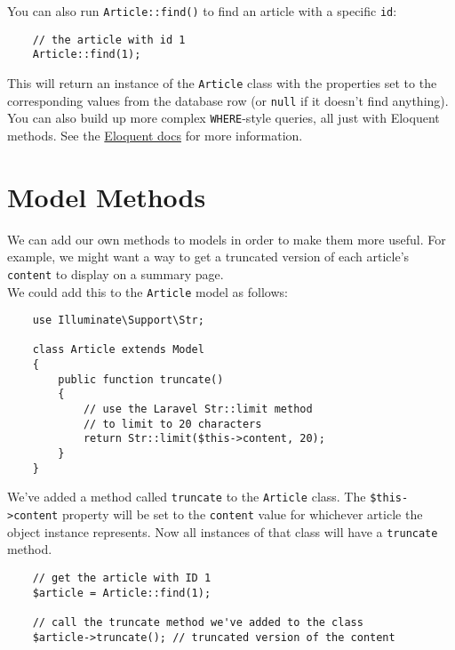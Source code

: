 You can also run \texttt{Article::find()} to find an article with a specific \texttt{id}:

\begin{verbatim}
    // the article with id 1
    Article::find(1);
\end{verbatim}

This will return an instance of the \texttt{Article} class with the properties set to the corresponding values from the database row (or \texttt{null} if it doesn't find anything).
\\

You can also build up more complex \texttt{WHERE}-style queries, all just with Eloquent methods. See the \href{http://laravel.com/docs/master/eloquent}{Eloquent docs} for more information.


\section{Model Methods}

We can add our own methods to models in order to make them more useful. For example, we might want a way to get a truncated version of each article's \texttt{content} to display on a summary page.
\\

We could add this to the \texttt{Article} model as follows:

\begin{verbatim}
    use Illuminate\Support\Str;

    class Article extends Model
    {
        public function truncate()
        {
            // use the Laravel Str::limit method
            // to limit to 20 characters
            return Str::limit($this->content, 20);
        }
    }
\end{verbatim}

We've added a method called \texttt{truncate} to the \texttt{Article} class.  The \texttt{\$this->content} property will be set to the \texttt{content} value for whichever article the object instance represents. Now all instances of that class will have a \texttt{truncate} method.

\begin{verbatim}
    // get the article with ID 1
    $article = Article::find(1);

    // call the truncate method we've added to the class
    $article->truncate(); // truncated version of the content
\end{verbatim}

